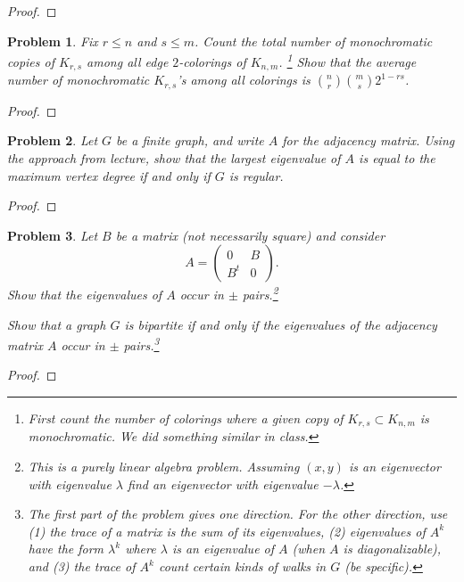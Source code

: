 \documentclass[11pt]{article}
\newtheorem{problem}{Problem}
\begin{document}
\begin{proof}

\end{proof}


\pagebreak 

\begin{problem}
Fix $r\le n$ and $s\le m$. Count the total number of monochromatic copies of $K_{r,s}$ among all edge $2$-colorings of $K_{n,m}$. \footnote{First count the number of colorings where a given copy of $K_{r,s}\subset K_{n,m}$ is monochromatic. We did something similar in class.} Show that the average number of monochromatic $K_{r,s}$'s among all colorings is ${n\choose r}{m\choose s}2^{1-rs}$. 
\end{problem}

\begin{proof}

\end{proof}

\pagebreak 


\begin{problem}
Let $G$ be a finite graph, and write $A$ for the adjacency matrix. Using the approach from lecture, show that the largest eigenvalue of $A$ is equal to the maximum vertex degree if and only if $G$ is regular. 
\end{problem}

\begin{proof}

\end{proof}


\pagebreak 


\begin{problem}
Let $B$ be a matrix (not necessarily square) and consider 
\[A=\left(\begin{array}{cc}0&B\\B^t&0\end{array}\right).\]
Show that the eigenvalues of $A$ occur in $\pm$ pairs.\footnote{This is a purely linear algebra problem. Assuming $(x,y)$ is an eigenvector with eigenvalue $\lambda$ find an eigenvector with eigenvalue $-\lambda$.} 

Show that a graph $G$ is bipartite if and only if the eigenvalues of the adjacency matrix $A$ occur in $\pm$ pairs.\footnote{The first part of the problem gives one direction. For the other direction, use (1) the trace of a matrix is the sum of its eigenvalues, (2) eigenvalues of $A^k$ have the form $\lambda^k$ where $\lambda$ is an eigenvalue of $A$ (when $A$ is diagonalizable), and (3) the trace of $A^k$ count certain kinds of walks in $G$ (be specific).}

\end{problem}

\begin{proof}

\end{proof}
\end{document}

